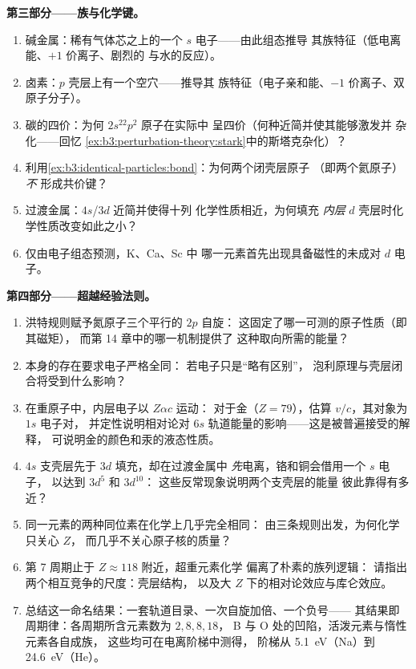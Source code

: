\begin{problem}
\medskip\noindent\textbf{第三部分——族与化学键。}
\begin{enumerate}[resume]
  \item 碱金属：稀有气体芯之上的一个 $s$ 电子——由此组态推导
        其族特征（低电离能、$+1$ 价离子、剧烈的
        与水的反应）。
  \item 卤素：$p$ 壳层上有一个空穴——推导其
        族特征（电子亲和能、$-1$ 价离子、双原子分子）。
  \item 碳的四价：为何 $2s^22p^2$ 原子在实际中
        呈四价（何种近简并使其能够激发并
        杂化——回忆
        \cref{ex:b3:perturbation-theory:stark}中的斯塔克杂化）？
  \item 利用\cref{ex:b3:identical-particles:bond}：为何两个闭壳层原子
        （即两个氦原子）\emph{不}
        形成共价键？
  \item 过渡金属：$4s$/$3d$ 近简并使得十列
        化学性质相近，为何填充
        \emph{内层} $d$ 壳层时化学性质改变如此之小？
  \item 仅由电子组态预测，K、Ca、Sc 中
        哪一元素首先出现具备磁性的未成对 $d$ 电子。
\end{enumerate}

\medskip\noindent\textbf{第四部分——超越经验法则。}
\begin{enumerate}[resume]
  \item 洪特规则赋予氮原子三个平行的 $2p$ 自旋：
        这固定了哪一可测的原子性质（即其磁矩），
        而第 14 章中的哪一机制提供了
        这种取向所需的能量？
  \item {}本身的存在要求电子严格全同：
        若电子只是“略有区别”，
        泡利原理与壳层闭合将受到什么影响？
  \item 在重原子中，内层电子以 $Z\alpha c$ 运动：
        对于金（$Z = 79$），估算 $v/c$，其对象为 $1s$ 电子对，
        并定性说明相对论对 $6s$
        轨道能量的影响——这是被普遍接受的解释，
        可说明金的颜色和汞的液态性质。
  \item $4s$ 支壳层先于 $3d$ 填充，却在过渡金属中
        \emph{先}电离，铬和铜会借用一个 $s$ 电子，
        以达到 $3d^5$ 和 $3d^{10}$：
        这些反常现象说明两个支壳层的能量
        彼此靠得有多近？
  \item 同一元素的两种同位素在化学上几乎完全相同：
        由三条规则出发，为何化学只关心 $Z$，
        而几乎不关心原子核的质量？
  \item 第 7 周期止于 $Z \approx 118$ 附近，超重元素化学
        偏离了朴素的族列逻辑：
        请指出两个相互竞争的尺度：壳层结构，
        以及大 $Z$ 下的相对论效应与库仑效应。
  \item 总结这一命名结果：一套轨道目录、一次自旋加倍、一个负号——
        其结果即周期律：各周期所含元素数为 $2, 8, 8, 18$，
        B 与 O 处的凹陷，活泼元素与惰性元素各自成族，
        这些均可在电离阶梯中测得，
        阶梯从 \qty{5.1}{eV}（Na）到
        \qty{24.6}{eV}（He）。
\end{enumerate}
\end{problem}
